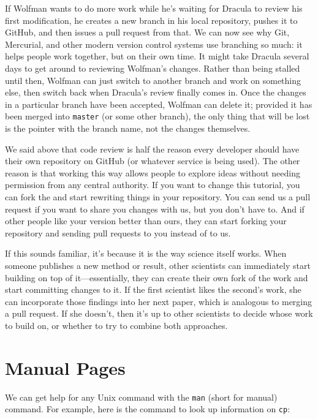 \documentclass{book}
\begin{document}
If Wolfman wants to do more work while he's waiting for Dracula to
review his first modification, he creates a new branch in his local
repository, pushes it to GitHub, and then issues a pull request from
that. We can now see why Git, Mercurial, and other modern version
control systems use branching so much: it helps people work together,
but on their own time. It might take Dracula several days to get around
to reviewing Wolfman's changes. Rather than being stalled until then,
Wolfman can just switch to another branch and work on something else,
then switch back when Dracula's review finally comes in. Once the
changes in a particular branch have been accepted, Wolfman can delete
it; provided it has been merged into \texttt{master} (or some other
branch), the only thing that will be lost is the pointer with the branch
name, not the changes themselves.

We said above that code review is half the reason every developer should
have their own repository on GitHub (or whatever service is being used).
The other reason is that working this way allows people to explore ideas
without needing permission from any central authority. If you want to
change this tutorial, you can fork the
 and start rewriting things in your repository. You can send
us a pull request if you want to share you changes with us, but you
don't have to. And if other people like your version better than ours,
they can start forking your repository and sending pull requests to you
instead of to us.

If this sounds familiar, it's because it is the way science itself
works. When someone publishes a new method or result, other scientists
can immediately start building on top of it---essentially, they can
create their own fork of the work and start committing changes to it. If
the first scientist likes the second's work, she can incorporate those
findings into her next paper, which is analogous to merging a pull
request. If she doesn't, then it's up to other scientists to decide
whose work to build on, or whether to try to combine both approaches.

\section{Manual Pages}

We can get help for any Unix command with the \texttt{man} (short for
manual) command. For example, here is the command to look up information
on \texttt{cp}:
\end{document}
